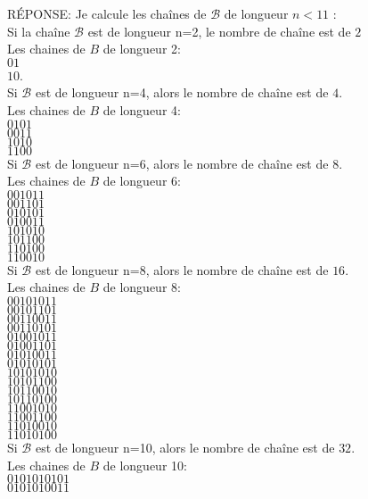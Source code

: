 \begin{enumerate}[\bf 1)]
\begin{framed}
RÉPONSE: Je calcule les chaînes de $\mathcal{B}$ de longueur $n<11$ : \\
Si la chaîne $\mathcal{B}$ est de longueur n=2, le nombre de chaîne est de $2$\\
Les chaines de $B$ de longueur 2:\\ $01$ \\ $10$.\\
Si $\mathcal{B}$ est de longueur n=4, alors le nombre de chaîne est de $4$.\\
Les chaines de $B$ de longueur 4: \\ $0101$ \\ $0011$ \\ $1010$ \\ $1100$\\
Si $\mathcal{B}$ est de longueur n=6, alors le nombre de chaîne est de $8$.\\
Les chaines de $B$ de longueur 6: \\ $001011$ \\ $001101$ \\ $010101$ \\ $010011$\\ $101010$ \\ $101100$ \\ $110100$ \\ $110010$\\
Si $\mathcal{B}$ est de longueur n=8, alors le nombre de chaîne est de $16$.\\
Les chaines de $B$ de longueur 8: \\ $00101011$ \\ $00101101$ \\ $00110011$ \\ $00110101$\\ $01001011$ \\ $01001101$ \\ $01010011$ \\ $01010101$\\ $10101010$ \\ $10101100$ \\ $10110010$ \\ $10110100$\\ $11001010$ \\ $11001100$ \\ $11010010$ \\ $11010100$\\
Si $\mathcal{B}$ est de longueur n=10, alors le nombre de chaîne est de $32$.\\
Les chaines de $B$ de longueur 10:\\ $0101010101$ \\ $0101010011$ \\

\end{framed}
\end{enumerate}
